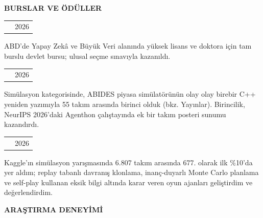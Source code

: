 \documentclass[11pt,a4paper]{article}
\makeatletter
\newcommand{\cvul}{\bgroup\markoverwith{\textcolor{muted!45}{\rule[-0.45ex]{2pt}{0.35pt}}}\ULon}
\newcommand{\hlink}[2]{\href{#1}{\cvul{#2}}}
\newcommand{\cvsection}[3][5]{%
  \par\Needspace*{#1\baselineskip}\vspace{6pt}%
  {\bfseries\fontsize{11}{13}\selectfont #3}\par\nobreak
  \vspace{3pt}{\color{muted}\hrule height 0.4pt}\nobreak\vspace{6pt}%
}
\newcommand{\cvheading}[2]{%
  \begin{tabularx}{\linewidth}{@{}>{\raggedright\arraybackslash}X@{\hspace{10pt}}r@{}}%
  \textbf{#1} & {\small\color{muted}#2}\\
  \end{tabularx}\par\nobreak
}
\newcommand{\cvbody}[1]{{\small\raggedright #1\par}}
\makeatother
\begin{document}
\cvsection{}{BURSLAR VE ÖDÜLLER}
\begin{minipage}{\linewidth}\raggedright
\cvheading{\small{}1416 YLSY Bursu · \hlink{https://rusen.ai/Sponsorship-MSc-PhD.pdf}{Yüksek Lisans ve Doktora}}{2026}\vspace{2pt}
\cvbody{ABD’de Yapay Zekâ ve Büyük Veri alanında yüksek lisans ve doktora için tam burslu devlet bursu; ulusal seçme sınavıyla kazanıldı.}
\end{minipage}\par\vspace{3pt}
\begin{minipage}{\linewidth}\raggedright
\cvheading{\small{}\hlink{https://www.agenthon.net/}{Birincilik · Agenthon 2026, Track 3 (Simülasyon)}}{2026}\vspace{2pt}
\cvbody{Simülasyon kategorisinde, ABIDES piyasa simülatörünün olay olay birebir C++ yeniden yazımıyla 55 takım arasında birinci olduk (bkz. Yayınlar). Birincilik, NeurIPS 2026’daki Agenthon çalıştayında ek bir takım posteri sunumu kazandırdı.}
\end{minipage}\par\vspace{3pt}
\begin{minipage}{\linewidth}\raggedright
\cvheading{\small{}\hlink{https://www.kaggle.com/certification/competitions/rusenbirben/pokemon-tcg-ai-battle}{Kaggle Bronz Madalya · The Pokémon Company PTCG AI Battle Challenge}}{2026}\vspace{2pt}
\cvbody{Kaggle’ın simülasyon yarışmasında 6.807 takım arasında 677. olarak ilk \%10’da yer aldım; replay tabanlı davranış klonlama, inanç-duyarlı Monte Carlo planlama ve self-play kullanan eksik bilgi altında karar veren oyun ajanları geliştirdim ve değerlendirdim.}
\end{minipage}\par\vspace{3pt}
\cvsection{}{ARAŞTIRMA DENEYİMİ}
\end{document}
